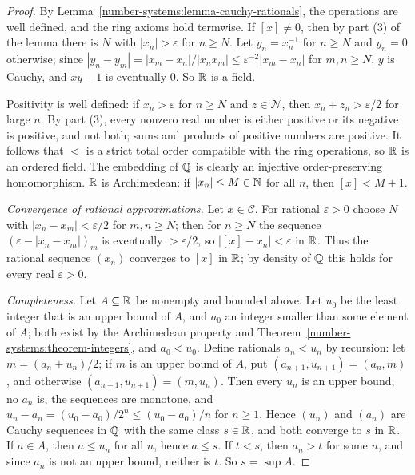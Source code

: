 \begin{proof}
By Lemma~\ref{number-systems:lemma-cauchy-rationals}, the operations are well
defined, and the ring axioms hold termwise. If $[x] \neq 0$, then by part (3)
of the lemma there is $N$ with $|x_n| > \varepsilon$ for $n \geq N$. Let
$y_n = x_n^{-1}$ for $n \geq N$ and $y_n = 0$ otherwise; since
$|y_n - y_m| = |x_m - x_n|/|x_n x_m| \leq \varepsilon^{-2}|x_m - x_n|$ for
$m, n \geq N$, $y$ is Cauchy, and $xy - 1$ is eventually $0$. So $\mathbb{R}$ is a field.

Positivity is well defined: if $x_n > \varepsilon$ for $n \geq N$ and
$z \in \mathcal{N}$, then $x_n + z_n > \varepsilon/2$ for large $n$. By part (3),
every nonzero real number is either positive or its negative is positive, and
not both; sums and products of positive numbers are positive. It follows that
$<$ is a strict total order compatible with the ring operations, so $\mathbb{R}$ is an
ordered field. The embedding of $\mathbb{Q}$ is clearly an injective order-preserving
homomorphism. $\mathbb{R}$ is Archimedean: if $|x_n| \leq M \in \mathbb{N}$ for all $n$, then
$[x] < M + 1$.

\emph{Convergence of rational approximations.} Let $x \in \mathcal{C}$. For
rational $\varepsilon > 0$ choose $N$ with $|x_n - x_m| < \varepsilon/2$ for
$m, n \geq N$; then for $n \geq N$ the sequence $(\varepsilon - |x_n - x_m|)_m$ is
eventually $> \varepsilon/2$, so $|[x] - x_n| < \varepsilon$ in $\mathbb{R}$. Thus the
rational sequence $(x_n)$ converges to $[x]$ in $\mathbb{R}$; by density of $\mathbb{Q}$ this
holds for every real $\varepsilon > 0$.

\emph{Completeness.} Let $A \subseteq \mathbb{R}$ be nonempty and bounded above. Let
$u_0$ be the least integer that is an upper bound of $A$, and $a_0$ an integer
smaller than some element of $A$; both exist by the Archimedean property and
Theorem~\ref{number-systems:theorem-integers}, and $a_0 < u_0$. Define rationals $a_n < u_n$ by
recursion: let $m = (a_n + u_n)/2$; if $m$ is an upper bound of $A$, put
$(a_{n+1}, u_{n+1}) = (a_n, m)$, and otherwise $(a_{n+1}, u_{n+1}) = (m, u_n)$.
Then every $u_n$ is an upper bound, no $a_n$ is, the sequences are monotone, and
$u_n - a_n = (u_0 - a_0)/2^n \leq (u_0 - a_0)/n$ for $n \geq 1$. Hence $(u_n)$ and
$(a_n)$ are Cauchy sequences in $\mathbb{Q}$ with the same class $s \in \mathbb{R}$, and both
converge to $s$ in $\mathbb{R}$. If $a \in A$, then $a \leq u_n$ for all $n$, hence
$a \leq s$. If $t < s$, then $a_n > t$ for some $n$, and since $a_n$ is not an upper
bound, neither is $t$. So $s = \sup A$.
\end{proof}

